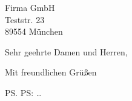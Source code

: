 \documentclass[absender]{scrlttr2}
\begin{document}
\begin{letter}{
    Firma GmbH\\%
    Teststr. 23\\%
    89554 München 
}

\KOMAoptions{
}



\opening{Sehr geehrte Damen und Herren,}

\closing{Mit freundlichen Grüßen}

\ps PS: \dots



\end{letter}
\end{document}
